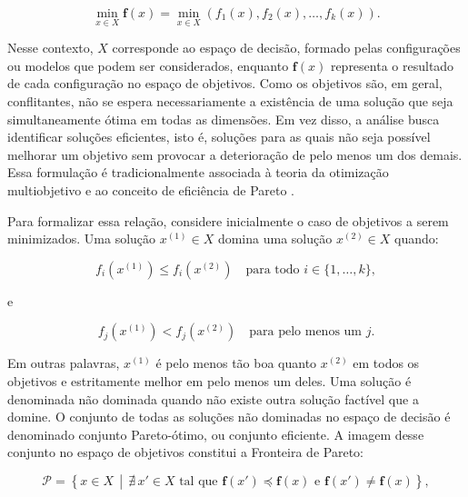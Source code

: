 \begin{equation}
    \min_{x \in X} \mathbf{f}(x)
    =
    \min_{x \in X}
    \left(f_1(x), f_2(x), \ldots, f_k(x)\right).
\end{equation}

Nesse contexto, $X$ corresponde ao espaço de decisão, formado pelas
configurações ou modelos que podem ser considerados, enquanto
$\mathbf{f}(x)$ representa o resultado de cada configuração no espaço
de objetivos. Como os objetivos são, em geral, conflitantes, não se
espera necessariamente a existência de uma solução que seja
simultaneamente ótima em todas as dimensões. Em vez disso, a análise
busca identificar soluções eficientes, isto é, soluções para as quais
não seja possível melhorar um objetivo sem provocar a deterioração de
pelo menos um dos demais. Essa formulação é tradicionalmente associada
à teoria da otimização multiobjetivo e ao conceito de eficiência de
Pareto \cite{pareto1964cours}.

Para formalizar essa relação, considere inicialmente o caso de
objetivos a serem minimizados. Uma solução $x^{(1)} \in X$ domina uma
solução $x^{(2)} \in X$ quando:

\begin{equation}
    f_i\left(x^{(1)}\right)
    \leq
    f_i\left(x^{(2)}\right)
    \quad
    \text{para todo } i \in \{1,\ldots,k\},
\end{equation}

e

\begin{equation}
    f_j\left(x^{(1)}\right)
    <
    f_j\left(x^{(2)}\right)
    \quad
    \text{para pelo menos um } j.
\end{equation}

Em outras palavras, $x^{(1)}$ é pelo menos tão boa quanto
$x^{(2)}$ em todos os objetivos e estritamente melhor em pelo menos
um deles. Uma solução é denominada não dominada quando não existe
outra solução factível que a domine. O conjunto de todas as soluções
não dominadas no espaço de decisão é denominado conjunto
Pareto-ótimo, ou conjunto eficiente. A imagem desse conjunto no
espaço de objetivos constitui a Fronteira de Pareto:

\begin{equation}
    \mathcal{P}
    =
    \left\{
        x \in X \,\middle|\,
        \nexists\, x' \in X
        \text{ tal que }
        \mathbf{f}(x') \preceq \mathbf{f}(x)
        \text{ e }
        \mathbf{f}(x') \neq \mathbf{f}(x)
    \right\},
\end{equation}

